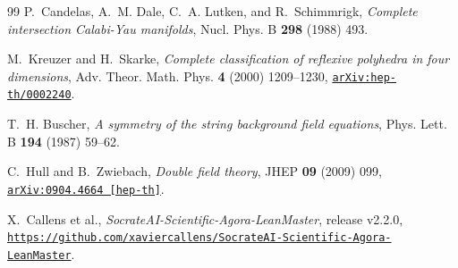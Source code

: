 \documentclass[11pt,a4paper]{article}
\begin{document}
\begin{thebibliography}{99}
P.~Candelas, A.~M. Dale, C.~A. Lutken, and R.~Schimmrigk,
\emph{Complete intersection Calabi-Yau manifolds},
Nucl. Phys. B \textbf{298} (1988) 493.

M.~Kreuzer and H.~Skarke,
\emph{Complete classification of reflexive polyhedra in four dimensions},
Adv. Theor. Math. Phys. \textbf{4} (2000) 1209--1230,
\href{https://arxiv.org/abs/hep-th/0002240}{\texttt{arXiv:hep-th/0002240}}.

T.~H. Buscher,
\emph{A symmetry of the string background field equations},
Phys. Lett. B \textbf{194} (1987) 59--62.

C.~Hull and B.~Zwiebach,
\emph{Double field theory},
JHEP \textbf{09} (2009) 099,
\href{https://arxiv.org/abs/0904.4664}{\texttt{arXiv:0904.4664 [hep-th]}}.

X.~Callens et al.,
\emph{SocrateAI-Scientific-Agora-LeanMaster}, release v2.2.0,
\href{https://github.com/xaviercallens/SocrateAI-Scientific-Agora-LeanMaster}{\texttt{https://github.com/xaviercallens/SocrateAI-Scientific-Agora-LeanMaster}}.

\end{thebibliography}
\end{document}
